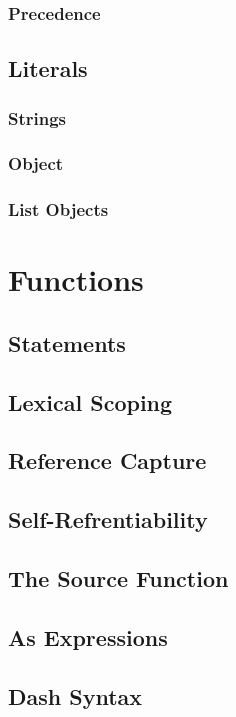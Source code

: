 \documentclass[12pt,letterpaper]{report}
\begin{document}
\subsection{Precedence}\label{Precedence}
\section{Literals}\label{Literals}
\subsection{Strings}\label{Strings}
\subsection{Object}\label{Object}
\subsection{List Objects}\label{List Objects}
\chapter{Functions}\label{Functions}
\section{Statements}\label{Statements}
\section{Lexical Scoping}\label{Lexical Scoping}
\section{Reference Capture}\label{Reference Capture}
\section{Self-Refrentiability}\label{Self-Refrentiability}
\section{The Source Function}\label{The Source Function}
\section{As Expressions}\label{As Expressions}
\section{Dash Syntax}\label{Dash Syntax}
\end{document}
